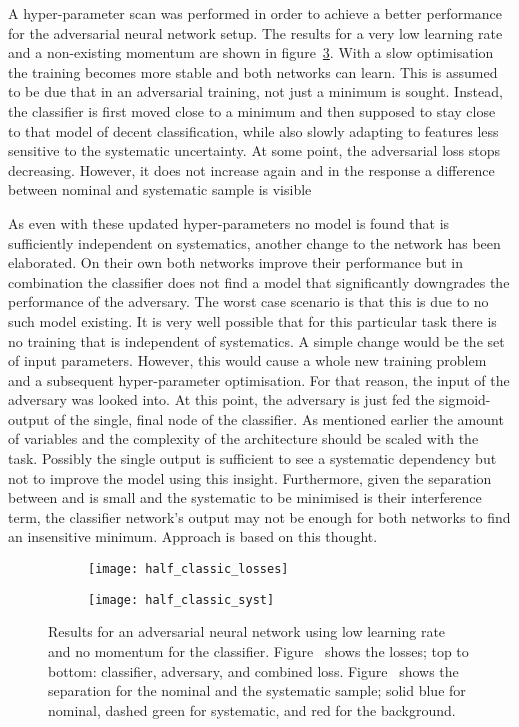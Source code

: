 A hyper-parameter scan was performed in order to achieve a better performance for the adversarial neural network setup. The results for a very low learning rate and a non-existing momentum are shown in figure~\ref{fig:app1:half}.
With a slow optimisation the training becomes more stable and both networks can learn. This is assumed to be due that in an adversarial training, not just a minimum is sought. Instead, the classifier is first moved close to a minimum and then supposed to stay close to that model of decent classification, while also slowly adapting to features less sensitive to the systematic uncertainty. At some point, the adversarial loss stops decreasing. However, it does not increase again and in the response a difference between nominal and systematic sample is visible

As even with these updated hyper-parameters no model is found that is sufficiently independent on systematics, another change to the network has been elaborated.
On their own both networks improve their performance but in combination the classifier does not find a model that significantly downgrades the performance of the adversary.
The worst case scenario is that this is due to no such model existing. It is very well possible that for this particular task there is no training that is independent of systematics.
A simple change would be the set of input parameters. However, this would cause a whole new training problem and a subsequent hyper-parameter optimisation. For that reason, the input of the adversary was looked into. At this point, the adversary is just fed the sigmoid-output of the single, final node of the classifier. As mentioned earlier the amount of variables and the complexity of the architecture should be scaled with the task. Possibly the single output is sufficient to see a systematic dependency but not to improve the model using this insight. Furthermore, given the separation between \tW and \ttbar is small and the systematic to be minimised is their interference term, the classifier network's output may not be enough for both networks to find an insensitive minimum. Approach  is based on this thought.

\begin{figure}[htbp]
    \centering
    \begin{subfigure}[b]{0.45\textwidth}
        \texttt{[image: half\_classic\_losses]}
        \caption{}
        \label{fig:app1:half:losses}
    \end{subfigure}
\quad
    \begin{subfigure}[b]{0.45\textwidth}
        \texttt{[image: half\_classic\_syst]}
        \caption{}
        \label{fig:app1:half:syst}
    \end{subfigure}
    \caption[ANN results for optimised parameters]{Results for an adversarial neural network using low learning rate and no momentum for the classifier. Figure~ shows the losses; top to bottom: classifier, adversary, and combined loss. Figure~ shows the separation for the nominal and the systematic sample; solid blue for nominal, dashed green for systematic, and red for the background.}
	\label{fig:app1:half}
\end{figure}


